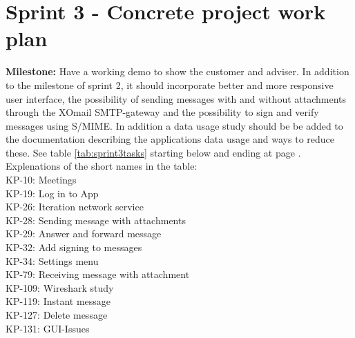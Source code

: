 \section{Sprint 3 - Concrete project work plan}

\textbf{Milestone:} Have a working demo to show the customer and adviser. In addition to the milestone of sprint 2, it should incorporate better and more responsive user interface, the possibility of sending messages with and without attachments through the XOmail SMTP-gateway and the possibility to sign and verify messages using S/MIME. In addition a data usage study should be be added to the documentation describing the applications data usage and ways to reduce these.
\newline
\newline
See table \ref{tab:sprint3tasks} starting below and ending at page \pageref{tab:sprint3tasks}.
\newline
\newline
Explenations of the short names in the table:\\
KP-10: Meetings\\
KP-19: Log in to App\\
KP-26: Iteration network service\\
KP-28: Sending message with attachments\\
KP-29: Answer and forward message\\
KP-32: Add signing to messages\\
KP-34: Settings menu\\
KP-79: Receiving message with attachment\\
KP-109: Wireshark study\\
KP-119: Instant message\\
KP-127: Delete message\\
KP-131: GUI-Issues\\




